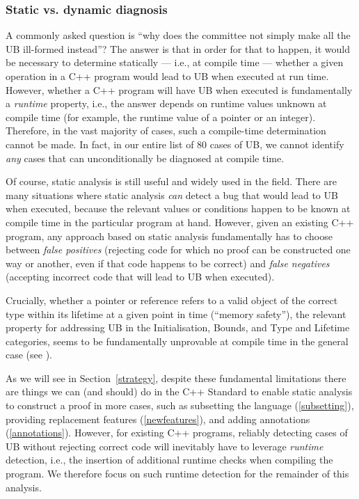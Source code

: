 \subsubsection{Static vs. dynamic diagnosis}
\label{statically}

A commonly asked question is ``why does the committee not simply make all the UB ill-formed instead''? The answer is that in order for that to happen, it would be necessary to determine statically --- i.e., at compile time --- whether a given operation in a C++ program would lead to UB when executed at run time. However, whether a C++ program will have UB when executed is fundamentally a \emph{runtime} property, i.e., the answer depends on runtime values unknown at compile time (for example, the runtime value of a pointer or an integer). Therefore, in the vast majority of cases, such a compile-time determination cannot be made. In fact, in our entire list of 80 cases of UB, we cannot identify \emph{any} cases that can unconditionally be diagnosed at compile time.

Of course, static analysis is still useful and widely used in the field. There are many situations where static analysis \emph{can} detect a bug that would lead to UB when executed, because the relevant values or conditions happen to be known at compile time in the particular program at hand. However, given an existing C++ program, any approach based on static analysis fundamentally has to choose between \emph{false positives} (rejecting code for which no proof can be constructed one way or another, even if that code happens to be correct) and \emph{false negatives} (accepting incorrect code that will lead to UB when executed). 

Crucially, whether a pointer or reference refers to a valid object of the correct type within its lifetime at a given point in time (``memory safety''), the relevant property for addressing UB in the Initialisation, Bounds, and Type and Lifetime categories, seems to be fundamentally unprovable at compile time in the general case (see \cite{Baxter2024}).

As we will see in Section~\ref{strategy}, despite these fundamental limitations there are things we can (and should) do in the C++ Standard to enable static analysis to construct a proof in more cases, such as subsetting the language (\ref{subsetting}), providing replacement features (\ref{newfeatures}), and adding annotations (\ref{annotations}). However, for existing C++ programs, reliably detecting cases of UB without rejecting correct code will inevitably have to leverage \emph{runtime} detection, i.e., the insertion of additional runtime checks when compiling the program. We therefore focus on such runtime detection for the remainder of this analysis.

